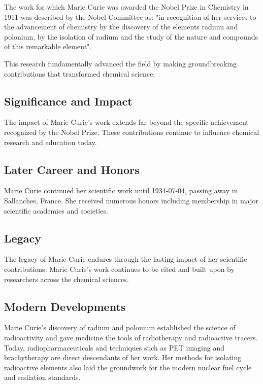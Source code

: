 The work for which Marie Curie was awarded the Nobel Prize in Chemistry in 1911 was described by the Nobel Committee as: "in recognition of her services to the advancement of chemistry by the discovery of the elements radium and polonium, by the isolation of radium and the study of the nature and compounds of this remarkable element".

This research fundamentally advanced the field by making groundbreaking contributions that transformed chemical science.

\subsection*{Significance and Impact}

The impact of Marie Curie's work extends far beyond the specific achievement recognized by the Nobel Prize.
These contributions continue to influence chemical research and education today.

\subsection*{Later Career and Honors}

Marie Curie continued her scientific work until 1934-07-04, passing away in Sallanches, France.
She received numerous honors including membership in major scientific academies and societies.

\subsection*{Legacy}

The legacy of Marie Curie endures through the lasting impact of her scientific contributions.
Marie Curie's work continues to be cited and built upon by researchers across the chemical sciences.

\subsection*{Modern Developments}

Marie Curie's discovery of radium and polonium established the science of radioactivity and gave medicine the tools of radiotherapy and radioactive tracers. Today, radiopharmaceuticals and techniques such as PET imaging and brachytherapy are direct descendants of her work. Her methods for isolating radioactive elements also laid the groundwork for the modern nuclear fuel cycle and radiation standards.

